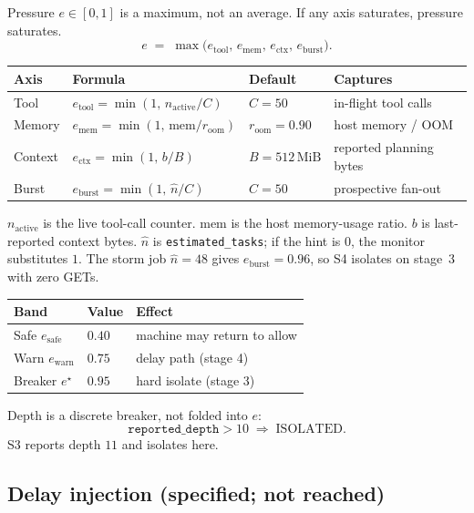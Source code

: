\documentclass[11pt,a4paper]{article}
\begin{document}
Pressure $e\in[0,1]$ is a maximum, not an average.
If any axis saturates, pressure saturates.
\begin{equation}
  e \;=\; \max\!\bigl(e_{\mathrm{tool}},\, e_{\mathrm{mem}},\, e_{\mathrm{ctx}},\, e_{\mathrm{burst}}\bigr).
\end{equation}

\begin{center}
\small
\begin{tabular}{@{}llll@{}}
\toprule
Axis & Formula & Default & Captures \\
\midrule
Tool & $e_{\mathrm{tool}}=\min(1,\, n_{\mathrm{active}}/C)$ & $C=50$ & in-flight tool calls \\
Memory & $e_{\mathrm{mem}}=\min(1,\, \mathrm{mem}/r_{\mathrm{oom}})$ & $r_{\mathrm{oom}}=0.90$ & host memory / OOM \\
Context & $e_{\mathrm{ctx}}=\min(1,\, b/B)$ & $B=512\,\mathrm{MiB}$ & reported planning bytes \\
Burst & $e_{\mathrm{burst}}=\min(1,\, \hat n/C)$ & $C=50$ & prospective fan-out \\
\bottomrule
\end{tabular}
\end{center}

$n_{\mathrm{active}}$ is the live tool-call counter.
$\mathrm{mem}$ is the host memory-usage ratio.
$b$ is last-reported context bytes.
$\hat n$ is \texttt{estimated\_tasks}; if the hint is $0$, the monitor substitutes $1$.
The storm job $\hat n=48$ gives $e_{\mathrm{burst}}=0.96$, so S4 isolates on stage~3 with zero GETs.

\begin{center}
\small
\begin{tabular}{@{}lll@{}}
\toprule
Band & Value & Effect \\
\midrule
Safe $e_{\mathrm{safe}}$ & $0.40$ & machine may return to allow \\
Warn $e_{\mathrm{warn}}$ & $0.75$ & delay path (stage 4) \\
Breaker $e^{\star}$ & $0.95$ & hard isolate (stage 3) \\
\bottomrule
\end{tabular}
\end{center}

Depth is a discrete breaker, not folded into $e$:
\[
\texttt{reported\_depth} > 10 \;\Rightarrow\; \mathrm{ISOLATED}.
\]
S3 reports depth $11$ and isolates here.

\subsection{Delay injection (specified; not reached)}
\end{document}
